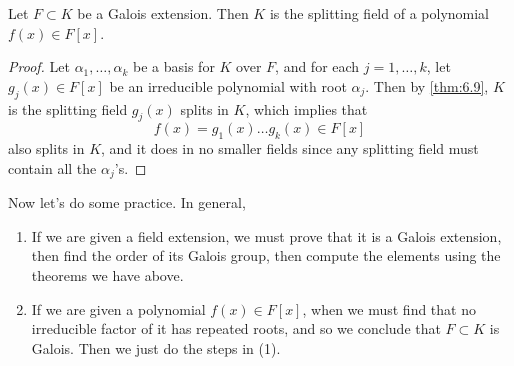   \begin{theorem}
    Let $F \subset K$ be a Galois extension. Then $K$ is the splitting field of a polynomial $f(x) \in F[x]$. 
  \end{theorem}
  \begin{proof}
    Let $\alpha_1, \ldots, \alpha_k$ be a basis for $K$ over $F$, and for each $j = 1, \ldots, k$, let $g_j (x) \in F[x]$ be an irreducible polynomial with root $\alpha_j$. Then by \ref{thm:6.9}, $K$ is the splitting field $g_j(x)$ splits in $K$, which implies that 
    \begin{equation}
      f(x) = g_1 (x) \ldots g_k(x) \in F[x]
    \end{equation}
    also splits in $K$, and it does in no smaller fields since any splitting field must contain all the $\alpha_j$'s. 
  \end{proof}

  Now let's do some practice. In general, 
  \begin{enumerate}
    \item If we are given a field extension, we must prove that it is a Galois extension, then find the order of its Galois group, then compute the elements using the theorems we have above. 
    \item If we are given a polynomial $f(x) \in F[x]$, when we must find that no irreducible factor of it has repeated roots, and so we conclude that $F \subset K$ is Galois. Then we just do the steps in (1). 
  \end{enumerate}

